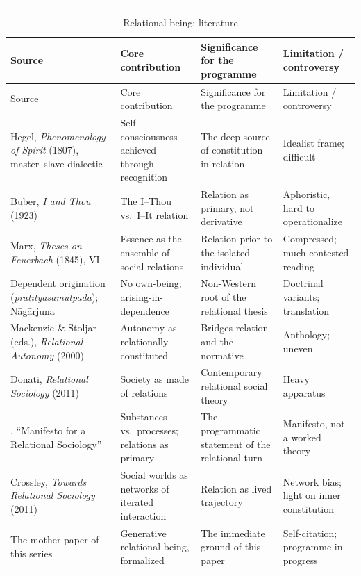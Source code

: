 \documentclass[11pt,a4paper]{article}
\newcommand{\goldrule}{\noindent\textcolor{gold}{\rule{\linewidth}{0.6pt}}\par\vspace{0.4em}}
\begin{document}
\goldrule
\footnotesize
\begin{longtable}{Y Y Y Y}
\caption{Relational being: literature}\label{p07:tab:lit-relbeing}\\
\toprule
{}
Source & Core contribution & Significance for the programme & Limitation / controversy \\
\midrule
\endfirsthead
{}
Source & Core contribution & Significance for the programme & Limitation / controversy \\
\midrule
\endhead
Hegel, \emph{Phenomenology of Spirit} (1807), master--slave dialectic & Self-consciousness achieved through recognition & The deep source of constitution-in-relation & Idealist frame; difficult \\
Buber, \emph{I and Thou} (1923) & The I--Thou vs.\ I--It relation & Relation as primary, not derivative & Aphoristic, hard to operationalize \\
Marx, \emph{Theses on Feuerbach} (1845), VI & Essence as the ensemble of social relations & Relation prior to the isolated individual & Compressed; much-contested reading \\
Dependent origination (\emph{pratītyasamutpāda}); Nāgārjuna & No own-being; arising-in-dependence & Non-Western root of the relational thesis & Doctrinal variants; translation \\
Mackenzie \& Stoljar (eds.), \emph{Relational Autonomy} (2000) & Autonomy as relationally constituted & Bridges relation and the normative & Anthology; uneven \\
Donati, \emph{Relational Sociology} (2011) & Society as made of relations & Contemporary relational social theory & Heavy apparatus \\
\textcite{emirbayer1997manifesto}, ``Manifesto for a Relational Sociology'' & Substances vs.\ processes; relations as primary & The programmatic statement of the relational turn & Manifesto, not a worked theory \\
Crossley, \emph{Towards Relational Sociology} (2011) & Social worlds as networks of iterated interaction & Relation as lived trajectory & Network bias; light on inner constitution \\
The mother paper of this series & Generative relational being, formalized & The immediate ground of this paper & Self-citation; programme in progress \\
\bottomrule
\end{longtable}
\end{document}
